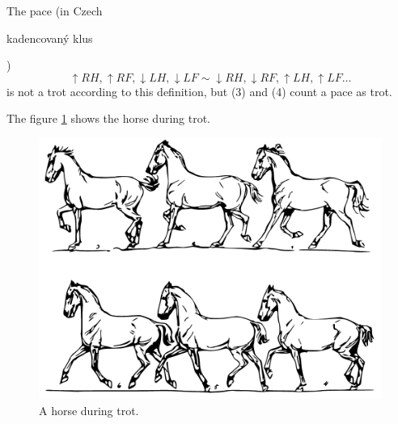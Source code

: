 \begin{remark}
    The pace (in Czech \begin{otherlanguage}{czech}kadencovaný klus\end{otherlanguage}) $$\uparrow RH, \uparrow RF, \downarrow LH, \downarrow LF \sim \downarrow RH, \downarrow RF, \uparrow LH, \uparrow LF \dots$$ is not a trot according to this definition, but (3) and (4) count a pace as trot.
\end{remark}

The figure \ref{fig:trot} shows the horse during trot.

\begin{figure}
	\centering
	\caption{A horse during trot. \cite{Duruttya2005}}
	\label{fig:trot}
	\includegraphics[width=\linewidth]{img/klus.pdf}
\end{figure}

